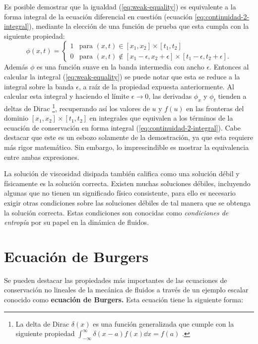 Es posible demostrar que la igualdad (\ref{eq:weak-equality}) es equivalente a la forma integral de la ecuación diferencial en cuestión (ecuación \ref{eq:continuidad-2-integral}), mediante la elección de una función de prueba que esta cumpla con la siguiente propiedad:
\begin{equation}
	\phi(x,t) = 
	\begin{cases}
		1 & \text{para } (x,t) \in [x_1, x_2] \times [t_1, t_2]\\
		0 & \text{para } (x,t) \notin [x_1 - \epsilon, x_2 + \epsilon] \times [t_1 - \epsilon, t_2 + \epsilon].
 	\end{cases}
\end{equation}
Además $\phi$ es una función suave en la banda intermedia con ancho $\epsilon$. Entonces al calcular la integral (\ref{eq:weak-equality})  se puede notar que esta se reduce a la integral sobre la banda $\epsilon$, a raíz de la propiedad expuesta anteriormente. Al calcular esta integral y haciendo el límite $\epsilon \rightarrow 0$, las derivadas $\phi_x$ y $\phi_t$ tienden a deltas de Dirac \footnote{La delta de Dirac $\delta(x)$ es una función generalizada que cumple con la siguiente propiedad $\int_{-\infty}^{\infty} \delta(x-a) f(x)\dd{x} = f(a)$ \cite{methods}.}, recuperando así los valores de $u$ y $ f(u)$ en las fronteras del dominio $ [x_1, x_2] \times [t_1, t_2]$ en integrales que equivalen a los términos de la ecuación de conservación en forma integral (\ref{eq:continuidad-2-integral}). Cabe destacar que este es un esbozo solamente de la demostración, ya que esta requiere más rigor matemático. Sin embargo, lo imprescindible es mostrar la equivalencia entre ambas expresiones.

La solución de viscosidad disipada también califica como una solución débil y físicamente es la solución correcta. Existen muchas soluciones débiles, incluyendo algunas que no tienen un significado físico consistente, para ello es necesario exigir otras condiciones sobre las soluciones débiles de tal manera que se obtenga la solución correcta. Estas condiciones son conocidas como \textit{condiciones de entropía} por su papel en la dinámica de fluidos.

\section{Ecuación de Burgers}
Se pueden destacar las propiedades más importantes de las ecuaciones de conservación no lineales de la mecánica de fluidos a través de un ejemplo escalar conocido como \textbf{ecuación de Burgers.} Esta ecuación tiene la siguiente forma:


